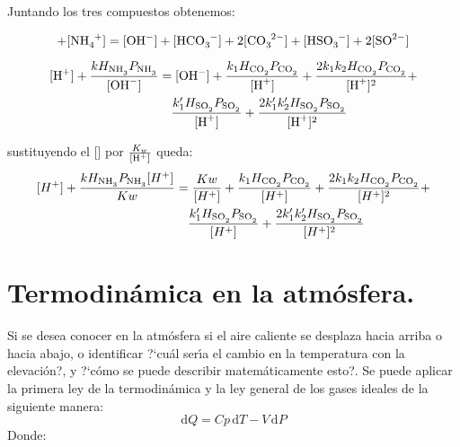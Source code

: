 Juntando los tres compuestos obtenemos:

\begin{equation*}
[H^+] + [\ce{NH4+}] = [\ce{OH-}]+[\ce{HCO3-}]+2[\ce{CO3^{2-}}]+[\ce{HSO3-}]+2[\ce{SO^{2-}}]
\end{equation*}

 \begin{equation*}
\begin{split}
[\ce{H+}] + \frac{kH_{\ce{NH3}}P_{\ce{NH3}}}{[\ce{OH-}]} &= [\ce{OH-}] + \frac{k_1H_{\ce{CO2}}P_{\ce{CO2}}}{[\ce{H+}]} +\frac{2k_1k_2H_{\ce{CO2}}P_{\ce{CO2}}}{[\ce{H+}]^2} + \\
&\quad\frac{k'_1H_{\ce{SO2}}P_{\ce{SO2}}} {[\ce{H+}]} + \frac{2k'_1k'_2H_{\ce{SO2}}P_{\ce{SO2}}}{[\ce{H+}]^2}
\end{split}
\end{equation*}

sustituyendo el []  por  $\frac{K_w}{[\ce{H+}]} $ queda: 
 \begin{equation*}
\begin{split}
[H^+] + \frac{kH_{\ce{NH3}}P_{\ce{NH3}}[H^+]}{Kw} &= \frac{Kw}{[H^+]} + \frac{k_1H_{\ce{CO2}}P_{\ce{CO2}}}{[H^+]} +\frac{2k_1k_2H_{\ce{CO2}}P_{\ce{CO2}}}{[H^+]^2} +\\ &\quad\frac{k'_1H_{\ce{SO2}}P_{\ce{SO2}}} {[H^+]} + \frac{2k'_1k'_2H_{\ce{SO2}}P_{\ce{SO2}}}{[H^+]^2}
\end{split}
\end{equation*}

\section{Termodin\'amica en la atm\'osfera.}
\label{tatm}

Si se desea conocer en la atm\'osfera si  el aire caliente se desplaza hacia arriba o hacia abajo, o identificar 
?`cu\'al ser\'{\i}a el cambio en la temperatura con la elevaci\'on?, y ?`c\'omo se puede describir matem\'aticamente esto?. Se puede aplicar  la primera ley de la termodin\'amica y la ley general de los gases ideales de la siguiente manera:
\begin{equation}
\mathrm{d}Q =Cp\,\mathrm{d}T -V\,\mathrm{d}P
\end{equation}
Donde:

